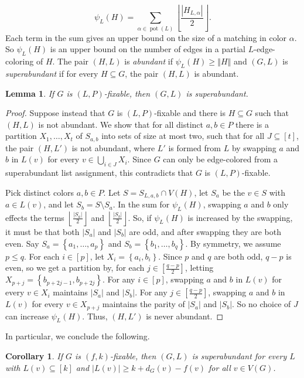 \documentclass[12pt]{article}
\theoremstyle{plain}
\newtheorem{lem}[thm]{Lemma}
\newtheorem{cor}[thm]{Corollary}
\theoremstyle{definition}
\theoremstyle{remark}
\newcommand{\set}[1]{\left\{ #1 \right\}}
\newcommand{\card}[1]{\left|#1\right|}
\newcommand{\size}[1]{\left\Vert#1\right\Vert}
\newcommand{\floor}[1]{\left\lfloor#1\right\rfloor}
\newcommand{\irange}[1]{\left[#1\right]}
\newcommand{\pot}{\operatorname{pot}}
\begin{document}
\[\psi_L(H) = \sum_{\alpha \in \pot(L)} \floor{\frac{\card{H_{L, \alpha}}}{2}}.\]
Each term in the sum gives an upper bound on the size of a matching in color
$\alpha$. So $\psi_L(H)$ is an upper bound on the number of edges in a
partial $L$-edge-coloring of $H$.  The pair $(H, L)$ is \emph{abundant} if
$\psi_L(H) \ge \size{H}$ and $(G,L)$ is \emph{superabundant} if for every
$H \subseteq G$, the pair $(H, L)$ is abundant.  

\begin{lem}
\label{SuperabundanceIsNecessary} 
If $G$ is $(L, P)$-fixable, then $(G, L)$ is superabundant.
\end{lem}
\begin{proof}
Suppose instead that $G$ is $(L, P)$-fixable and there is $H \subseteq
G$ such that $(H, L)$ is not abundant. We show that for all distinct $a,b \in
P$ there is a partition $X_1, \ldots, X_t$ of $S_{a,b}$ into sets of size at
most two, such that for all $J \subseteq \irange{t}$, the pair $(H,L')$ is not
abundant, where $L'$ is formed from $L$ by swapping $a$ and $b$ in $L(v)$ for
every $v \in \bigcup_{i \in J} X_i$.  Since $G$ can only be edge-colored from
a superabundant list assignment, this contradicts that $G$ is $(L,P)$-fixable.

Pick distinct colors $a,b \in P$.  Let $S = S_{L,a,b} \cap V(H)$, let $S_a$ be the
$v \in S$ with $a \in L(v)$, and let $S_b = S\setminus S_a$.  
In the sum for $\psi_L(H)$, swapping $a$ and $b$ only effects the terms
$\floor{\frac{\card{S_a}}{2}}$ and $\floor{\frac{\card{S_b}}{2}}$.
So, if $\psi_L(H)$ is increased
by the swapping, it must be that both $|S_a|$ and $|S_b|$ are odd, and after
swapping they are both even.  Say $S_a = \set{a_1, \ldots,a_p}$ and $S_b =
\set{b_1, \ldots,b_q}$.  By symmetry, we assume $p \le q$.  For each $i \in
\irange{p}$, let $X_i = \set{a_i, b_i}$.  Since $p$ and $q$ are both odd, $q-p$
is even, so we get a partition by, for each $j \in \irange{\frac{q-p}{2}}$,
letting $X_{p + j} = \set{b_{p + 2j - 1}, b_{p + 2j}}$.  For any $i \in
\irange{p}$, swapping $a$ and $b$ in $L(v)$ for every $v \in X_i$ maintains
$|S_a|$ and $|S_b|$.  For any $j \in \irange{\frac{q-p}{2}}$, swapping $a$ and
$b$ in $L(v)$ for every $v \in X_{p+j}$ maintains the parity of $|S_a|$ and
$|S_b|$.  So no choice of $J$ can increase $\psi_L(H)$. Thus, $(H,L')$ is
never abundant.
\end{proof}

In particular, we conclude the following.

\begin{cor}
If $G$ is $(f,k)$-fixable, then $(G,L)$ is superabundant for every $L$ with
$L(v) \subseteq \irange{k}$ and $|L(v)| \ge k + d_{G}(v) - f(v)$ for all $v \in V(G)$.
\end{cor}
\end{document}
